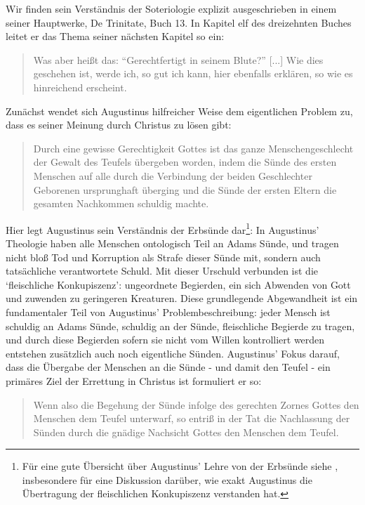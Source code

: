 Wir finden sein Verständnis der Soteriologie explizit ausgeschrieben in einem seiner Hauptwerke, De Trinitate, Buch 13.
In Kapitel elf des dreizehnten Buches leitet er das Thema seiner nächsten Kapitel so ein:
\begin{quote}
	Was aber heißt das: ``Gerechtfertigt in seinem Blute?''
	[...]
	Wie dies geschehen ist, werde ich, so gut ich kann, hier ebenfalls erklären, so wie es hinreichend erscheint.
\end{quote}
Zunächst wendet sich Augustinus hilfreicher Weise dem eigentlichen Problem zu, dass es seiner Meinung durch Christus zu lösen gibt:
\begin{quote}
	 Durch eine gewisse Gerechtigkeit Gottes ist das ganze Menschengeschlecht der Gewalt des Teufels übergeben worden, indem die Sünde des ersten Menschen auf alle durch die Verbindung der beiden Geschlechter Geborenen ursprunghaft überging und die Sünde der ersten Eltern die gesamten Nachkommen schuldig machte.
\end{quote}
Hier legt Augustinus sein Verständnis der Erbsünde dar\footnote{
Für eine gute Übersicht über Augustinus' Lehre von der Erbsünde siehe \Cite{augustins-original-sin},
insbesondere für eine Diskussion darüber, wie exakt Augustinus die Übertragung der fleischlichen Konkupiszenz verstanden hat.
}:
In Augustinus' Theologie haben alle Menschen ontologisch Teil an Adams Sünde, und tragen nicht bloß Tod und Korruption als Strafe dieser Sünde mit, sondern
auch tatsächliche verantwortete Schuld.
Mit dieser Urschuld verbunden ist die `fleischliche Konkupiszenz': ungeordnete Begierden, ein sich Abwenden von Gott und zuwenden zu geringeren Kreaturen.
Diese grundlegende Abgewandheit ist ein fundamentaler Teil von Augustinus' Problembeschreibung: jeder Mensch ist schuldig an Adams Sünde, schuldig an der Sünde, fleischliche Begierde zu tragen, und durch diese Begierden sofern sie nicht vom Willen kontrolliert werden entstehen zusätzlich auch noch eigentliche Sünden.
Augustinus' Fokus darauf, dass die Übergabe der Menschen an die Sünde - und damit den Teufel - ein primäres Ziel der Errettung in Christus ist formuliert er so:
\begin{quote}
	Wenn also die Begehung der Sünde infolge des gerechten Zornes Gottes den Menschen dem Teufel unterwarf,
	so entriß in der Tat die Nachlassung der Sünden durch die gnädige Nachsicht Gottes den Menschen dem Teufel.
\end{quote}
